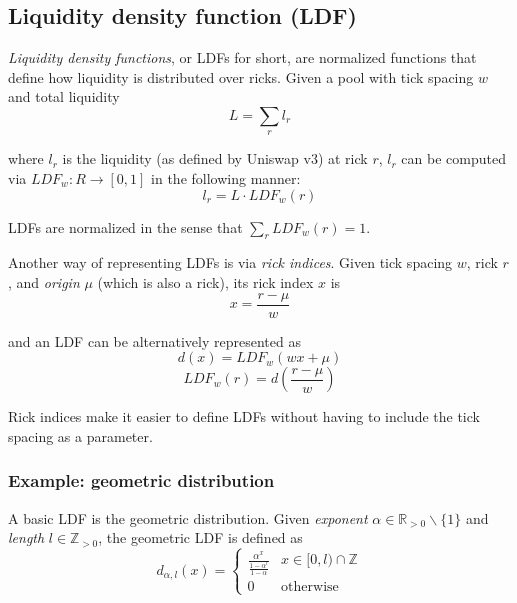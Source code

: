 \documentclass[twocolumn]{article}
\begin{document}
\subsection{Liquidity density function (LDF)}

\textit{Liquidity density functions}, or LDFs for short, are normalized functions that define how liquidity is distributed over ricks. Given a pool with tick spacing $w$ and total liquidity
\begin{equation}
  L = \sum_{r}l_r    
\end{equation}

where $l_r$ is the liquidity (as defined by Uniswap v3) at rick $r$, $l_r$ can be computed via $LDF_w: R \to [0, 1]$ in the following manner:
\begin{equation} 
  l_r = L \cdot LDF_w(r)
\end{equation}

LDFs are normalized in the sense that $\sum_r LDF_w(r) = 1$.

Another way of representing LDFs is via \textit{rick indices}. Given tick spacing $w$, rick $r$, and \textit{origin} $\mu$ (which is also a rick), its rick index $x$ is
\begin{equation}
  x = \frac{r - \mu}{w}  
\end{equation}

and an LDF can be alternatively represented as  
\begin{equation}
  d(x) = LDF_w (wx + \mu)
\end{equation}
\begin{equation}
  LDF_w (r) = d(\frac{r - \mu}{w})
\end{equation}

Rick indices make it easier to define LDFs without having to include the tick spacing as a parameter.

\subsubsection{Example: geometric distribution}

A basic LDF is the geometric distribution. Given \textit{exponent} $\alpha \in \mathbb R_{>0} \backslash \{1\}$ and \textit{length} $l \in \mathbb Z_{>0}$, the geometric LDF is defined as  
\begin{equation}
  d_{\alpha, l}(x) =
  \begin{cases}
    \frac{\alpha^x}{\frac{1 - \alpha^l}{1 - \alpha}} & x \in [0, l) \cap \mathbb Z \\
    0 & \text{otherwise}
  \end{cases}
\end{equation}
\end{document}
